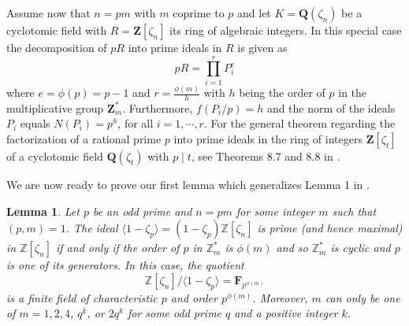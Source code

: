 \documentclass[10pt,a4paper]{amsart}
\newtheorem{lemma}[theorem]{Lemma}
\def\Z{\mathbf{Z}}
\def\Q{\mathbf{Q}}
\def\F{\mathbf{F}}
\begin{document}
Assume now that $n=pm $ with $m$ coprime to $p$ and let $K= \Q(\zeta_n)$  be a cyclotomic field with  $R= \Z[\zeta_n]$ its ring of algebraic integers. In this special case  the decomposition of $pR$ into prime ideals in $R$ is given as 
\[
pR=  \prod_{i=1}^r P_i^e
\]
where  $e= \phi(p)=p-1$ and  $r= \frac{\phi(m)}{h}$ with  $h$ being the order of $p$ in the multiplicative group $\Z_m^*$. Furthermore, $f(P_i/p) = h$ and the norm of the ideals $P_i$ equals $N(P_i)=p^h$,  for all $i=1, \cdots, r$. 
For the general theorem regarding the factorization of a rational  prime $p$ into prime ideals in the ring of integers $\Z[\zeta_t]$ of  a cyclotomic field $\Q(\zeta_t)$ with $p \mid t$,  see Theorems 8.7 and 8.8 in \cite{Mann}.

We are now ready to prove our first lemma which generalizes  Lemma 1 in \cite{Frenkel}. 
\begin{lemma}\label{Lem:MaximalIdeal}
Let $p$ be an odd prime and $n = pm$ for some integer $m$ such that $(p, m) = 1$. The ideal $\langle 1 - \zeta_p \rangle = (1 - \zeta_p)\mathbb{Z}[\zeta_n]$ is prime (and hence maximal) in $\mathbb{Z}[\zeta_n]$ if and only if the order of $p$ in $\mathbb{Z}_m^*$ is $\phi(m)$ and so $\mathbb{Z}_m^*$ is cyclic and  $p$ is one of its  generators. In this case, the quotient 
\[
\mathbb{Z}[\zeta_{n}]/\langle 1 - \zeta_p \rangle = \F_{p^{\phi(m)}}
\] 
is a finite field of characteristic $p$ and order $p^{\phi(m)}$. Moreover, $m$ can only be one of  $m=1,2,4$, $q^k$, or $2q^k$ for some odd prime $q$ and a positive integer  $k$.
\end{lemma}
\end{document}
